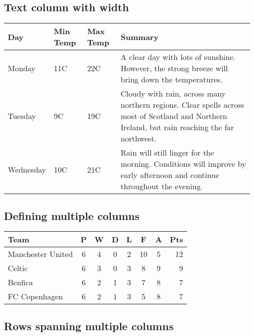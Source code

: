 \documentclass{article}
\begin{document}
  \subsection{Text column with width}

  \begin{center}
    \begin{tabular}{ | l | l | l | p{5cm} |}
      \hline
      Day & Min Temp & Max Temp & Summary \\ \hline
      Monday & 11C & 22C & A clear day with lots of sunshine.
      However, the strong breeze will bring down the temperatures. \\ \hline
      Tuesday & 9C & 19C & Cloudy with rain, across many northern regions. Clear spells
      across most of Scotland and Northern Ireland,
      but rain reaching the far northwest. \\ \hline
      Wednesday & 10C & 21C & Rain will still linger for the morning.
      Conditions will improve by early afternoon and continue
      throughout the evening. \\
      \hline
    \end{tabular}
  \end{center}

  \subsection{Defining multiple columns}

  \begin{tabular}{l*{6}{c}r}
    Team              & P & W & D & L & F  & A & Pts \\
    \hline
    Manchester United & 6 & 4 & 0 & 2 & 10 & 5 & 12  \\
    Celtic            & 6 & 3 & 0 & 3 &  8 & 9 &  9  \\
    Benfica           & 6 & 2 & 1 & 3 &  7 & 8 &  7  \\
    FC Copenhagen     & 6 & 2 & 1 & 3 &  5 & 8 &  7  \\
  \end{tabular}

  \subsection{Rows spanning multiple columns}
\end{document}
